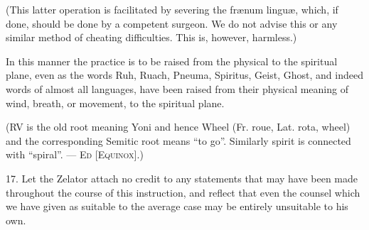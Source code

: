(This latter operation is facilitated by severing the fr\ae{}num lingu\ae{}, which, if done, should be done by a competent surgeon. We do not advise this or any similar method of cheating difficulties. This is, however, harmless.)

In this manner the practice is to be raised from the physical to the spiritual plane, even as the words Ruh, Ruach, Pneuma, Spiritus, Geist, Ghost, and indeed words of almost all languages, have been raised from their physical meaning of wind, breath, or movement, to the spiritual plane.

(RV is the old root meaning Yoni and hence Wheel (Fr. roue, Lat. rota, wheel) and the corresponding Semitic root means \enquote{to go}. Similarly spirit is connected with \enquote{spiral}. --- \textsc{Ed [Equinox]}.)

17. Let the Zelator attach no credit to any statements that may have been made throughout the course of this instruction, and reflect that even the counsel which we have given as suitable to the average case may be entirely unsuitable to his own.

